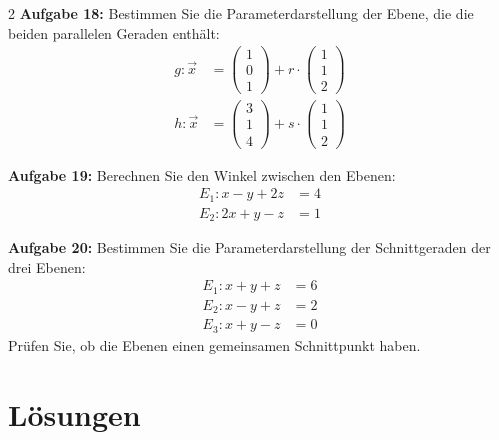\documentclass[12pt,a4paper]{article}
\newcommand{\vek}[1]{\vec{#1}}
\begin{document}
\begin{multicols}{2}
\textbf{Aufgabe 18:} Bestimmen Sie die Parameterdarstellung der Ebene, die die beiden parallelen Geraden enthält:
\begin{align*}
g: \vek{x} &= \begin{pmatrix}1\\0\\1\end{pmatrix} + r \cdot \begin{pmatrix}1\\1\\2\end{pmatrix} \\
h: \vek{x} &= \begin{pmatrix}3\\1\\4\end{pmatrix} + s \cdot \begin{pmatrix}1\\1\\2\end{pmatrix}
\end{align*}

\vspace{3cm}

\textbf{Aufgabe 19:} Berechnen Sie den Winkel zwischen den Ebenen:
\begin{align*}
E_1: x - y + 2z &= 4 \\
E_2: 2x + y - z &= 1
\end{align*}

\vspace{3cm}

\textbf{Aufgabe 20:} Bestimmen Sie die Parameterdarstellung der Schnittgeraden der drei Ebenen:
\begin{align*}
E_1: x + y + z &= 6 \\
E_2: x - y + z &= 2 \\
E_3: x + y - z &= 0
\end{align*}
Prüfen Sie, ob die Ebenen einen gemeinsamen Schnittpunkt haben.

\end{multicols}

\newpage

\section*{Lösungen}
\end{document}
